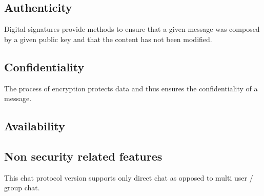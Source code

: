 \subsection{Authenticity}
Digital signatures provide methods to ensure that a given message
was composed by a given public key and that the content has not been
modified.
\subsection{Confidentiality}
The process of encryption protects data and thus ensures the
confidentiality of a message.
\subsection{Availability}
\subsection{Non security related features}
This chat protocol version supports only direct chat as opposed to
multi user / group chat.


